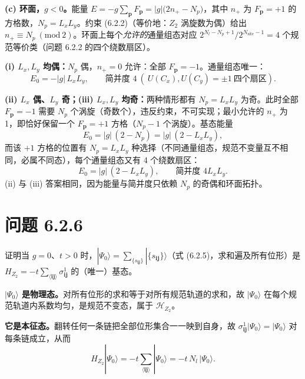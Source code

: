 \textbf{(c) 环面，$g<0$。}能量 $E=-g\sum_{\pmb p}F_{\pmb p}=|g|\bigl(2n_{+}-N_p\bigr)$，其中 $n_{+}$ 为 $F_{\pmb p}=+1$ 的方格数，$N_p=L_xL_y$。约束 (6.2.2)（等价地：$Z_2$ 涡旋数为偶）给出 $n_{+}\equiv N_p\ (\mathrm{mod}\ 2)$。环面上每个\emph{允许的}通量组态对应 $2^{N_l-N_p+1}/2^{N_{\text{site}}-1}=4$ 个规范等价类（问题 6.2.2 的四个绕数扇区）。

\textbf{(i) $L_x,L_y$ 均偶：}$N_p$ 偶，$n_{+}=0$ 允许：全部 $F_{\pmb p}=-1$。通量组态唯一：
\begin{equation*}
\boxed{\ E_0=-|g|\,L_xL_y,\qquad \text{简并度 }4\ (\ U(C_x),U(C_y)=\pm1\ \text{四个扇区}) .\ }
\end{equation*}

\textbf{(ii) $L_x$ 偶、$L_y$ 奇；\textbf{(iii)} $L_x,L_y$ 均奇：}两种情形都有 $N_p=L_xL_y$ 为奇。此时全部 $F_{\pmb p}=-1$ 需要 $N_p$ 个涡旋（奇数个），违反约束，不可实现；最小允许的 $n_{+}$ 为 1，即恰好保留一个 $F_{\pmb p}=+1$ 方格（$N_p-1$ 个涡旋）。基态能量
\begin{equation*}
E_0=|g|\,(2-N_p)=|g|\,(2-L_xL_y),
\end{equation*}
而该 $+1$ 方格的位置有 $N_p=L_xL_y$ 种选择（不同通量组态，规范不变量互不相同，必属不同态），每个通量组态又有 4 个绕数扇区：
\begin{equation*}
\boxed{\ E_0=|g|\,(2-L_xL_y),\qquad \text{简并度 }4L_xL_y .\ }
\end{equation*}
(ii) 与 (iii) 答案相同，因为能量与简并度只依赖 $N_p$ 的奇偶和环面拓扑。

\section*{问题 6.2.6}
\begin{problem}
证明当 $g=0$、$t>0$ 时，$|\Psi_0\rangle=\sum_{\{s_{\pmb{ij}}\}}|\{s_{\pmb{ij}}\}\rangle$（式 (6.2.5)，求和遍及所有位形）是 $H_{Z_2}=-t\sum_{\langle\pmb{ij}\rangle}\sigma^1_{\pmb{ij}}$ 的（唯一）基态。
\end{problem}
\solution

\textbf{$|\Psi_0\rangle$ 是物理态。}对所有位形的求和等于对所有规范轨道的求和，故 $|\Psi_0\rangle$ 在每个规范轨道内系数均匀，是规范不变态，属于 $\mathcal{H}_{Z_2}$。

\textbf{它是本征态。}翻转任何一条链把全部位形集合一一映到自身，故 $\sigma^1_{\pmb{ij}}|\Psi_0\rangle=|\Psi_0\rangle$ 对每条链成立，从而
\begin{equation*}
H_{Z_2}|\Psi_0\rangle=-t\sum_{\langle\pmb{ij}\rangle}|\Psi_0\rangle=-t\,N_l\,|\Psi_0\rangle .
\end{equation*}

